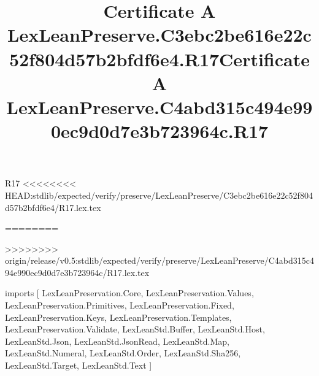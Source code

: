 \begin{lexlean}{R17}
<<<<<<<< HEAD:stdlib/expected/verify/preserve/LexLeanPreserve/C3ebc2be616e22c52f804d57b2bfdf6e4/R17.lex.tex
\title{Certificate A LexLeanPreserve.C3ebc2be616e22c52f804d57b2bfdf6e4.R17}
========
\title{Certificate A LexLeanPreserve.C4abd315c494e990ec9d0d7e3b723964c.R17}
>>>>>>>> origin/release/v0.5:stdlib/expected/verify/preserve/LexLeanPreserve/C4abd315c494e990ec9d0d7e3b723964c/R17.lex.tex
\begin{coremodule}
imports [
  LexLeanPreservation.Core,
  LexLeanPreservation.Values,
  LexLeanPreservation.Primitives,
  LexLeanPreservation.Fixed,
  LexLeanPreservation.Keys,
  LexLeanPreservation.Templates,
  LexLeanPreservation.Validate,
  LexLeanStd.Buffer,
  LexLeanStd.Host,
  LexLeanStd.Json,
  LexLeanStd.JsonRead,
  LexLeanStd.Map,
  LexLeanStd.Numeral,
  LexLeanStd.Order,
  LexLeanStd.Sha256,
  LexLeanStd.Target,
  LexLeanStd.Text
]


\end{coremodule}
\end{lexlean}
